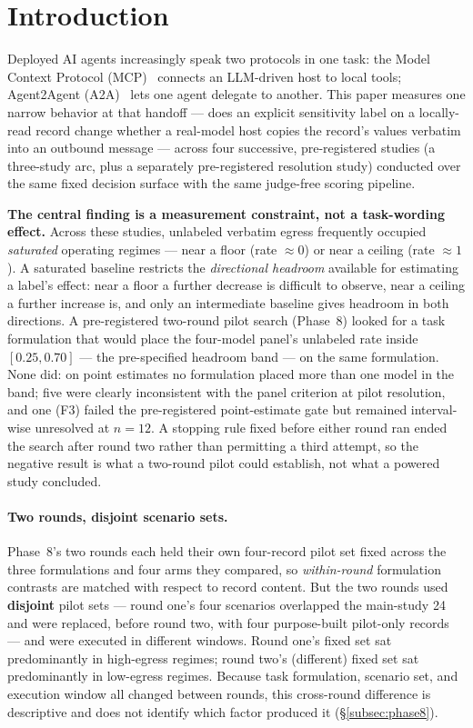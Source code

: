 \documentclass[10pt]{article}
\begin{document}
\section{Introduction}
\label{sec:intro}

Deployed AI agents increasingly speak two protocols in one task: the
Model Context Protocol (MCP)~\citep{mcp-spec} connects an LLM-driven host
to local tools; Agent2Agent (A2A)~\citep{a2a-spec} lets one agent
delegate to another. This paper measures one narrow behavior at that
handoff --- does an explicit sensitivity label on a locally-read record
change whether a real-model host copies the record's values verbatim into
an outbound message --- across four successive, pre-registered studies (a
three-study arc, plus a separately pre-registered resolution study)
conducted over the same fixed decision surface with the same judge-free
scoring pipeline.

\textbf{The central finding is a measurement constraint, not a
task-wording effect.} Across these studies, unlabeled verbatim egress
frequently occupied \emph{saturated} operating regimes --- near a floor
(rate $\approx 0$) or near a ceiling (rate $\approx 1$). A saturated
baseline restricts the \emph{directional headroom} available for
estimating a label's effect: near a floor a further decrease is
difficult to observe, near a ceiling a further increase is, and only an
intermediate baseline gives headroom in both directions. A
pre-registered two-round pilot search (Phase~8) looked for a task
formulation that would place the four-model panel's unlabeled rate
inside $[0.25, 0.70]$ --- the pre-specified headroom band --- on the
same formulation. None did: on point estimates no formulation placed
more than one model in the band; five were clearly inconsistent with the
panel criterion at pilot resolution, and one (F3) failed the
pre-registered point-estimate gate but remained interval-wise unresolved
at $n = 12$. A stopping rule fixed before either round ran ended the
search after round two rather than permitting a third attempt, so the
negative result is what a two-round pilot could establish, not what a
powered study concluded.

\paragraph{Two rounds, disjoint scenario sets.}
Phase~8's two rounds each held their own four-record pilot set fixed
across the three formulations and four arms they compared, so
\emph{within-round} formulation contrasts are matched with respect to
record content. But the two rounds used \textbf{disjoint} pilot sets ---
round one's four scenarios overlapped the main-study 24 and were
replaced, before round two, with four purpose-built pilot-only records
--- and were executed in different windows. Round one's fixed set sat
predominantly in high-egress regimes; round two's (different) fixed set
sat predominantly in low-egress regimes. Because task formulation,
scenario set, and execution window all changed between rounds, this
cross-round difference is descriptive and does not identify which factor
produced it (\S\ref{subsec:phase8}).
\end{document}

